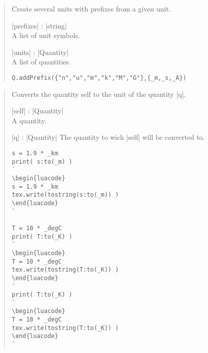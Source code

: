 \documentclass{ltxdoc}
\begin{document}
\begin{quote}
  Create several units with prefixes from a given unit.

  \begin{description}
  \item |prefixes| : |string|\\
    A list of unit symbols.

  \item |units| : |Quantity|\\
    A list of quantities.
  \end{description}


\begin{lstlisting}
Q.addPrefix({"n","u","m","k","M","G"},{_m,_s,_A})
\end{lstlisting}
\end{quote}




\begin{quote}
  Converts the quantity self to the unit of the quantity |q|.

  \begin{description}
  \item |self| : |Quantity|\\
    A quantity.

  \item |q| : |Quantity|
    The quantity to wich |self| will be converted to.
  \end{description}

\begin{lstlisting}
s = 1.9 * _km
print( s:to(_m) )
`
\begin{luacode}
s = 1.9 * _km
tex.write(tostring(s:to(_m)) )
\end{luacode}
`

T = 10 * _degC
print( T:to(_K) )
`
\begin{luacode}
T = 10 * _degC
tex.write(tostring(T:to(_K)) )
\end{luacode}
`
print( T:to(_K) )
`
\begin{luacode}
T = 10 * _degC
tex.write(tostring(T:to(_K)) )
\end{luacode}
`
\end{lstlisting}

\end{quote}
\end{document}
